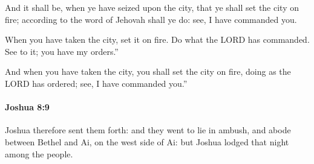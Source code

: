			\begin{versebox}
					\item[BHS] 
					\item[ASV] And it shall be, when ye have seized upon the city, that ye shall set the city on fire; according to the word of Jehovah shall ye do: see, I have commanded you.
					\item[NIV] When you have taken the city, set it on fire. Do what the LORD has commanded. See to it; you have my orders.”
					\item[NRSV] And when you have taken the city, you shall set the city on fire, doing as the LORD has ordered; see, I have commanded you.”
			\end{versebox}

		\paragraph{Joshua 8:9} %
			\label{JOSHUA-8-9}

			Joshua therefore sent them forth: and they went to lie in ambush, and abode between Bethel and Ai, on the west side of Ai: but Joshua lodged that night among the people.

